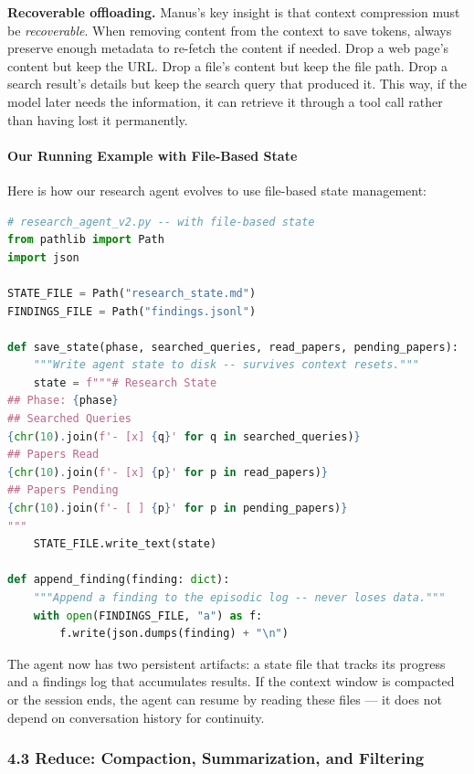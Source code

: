 \documentclass[11pt, a4paper]{article}
\begin{document}
\textbf{Recoverable offloading.} Manus's key insight is that context
compression must be \emph{recoverable}. When removing content from the
context to save tokens, always preserve enough metadata to re-fetch the
content if needed. Drop a web page's content but keep the URL. Drop a
file's content but keep the file path. Drop a search result's details
but keep the search query that produced it. This way, if the model later
needs the information, it can retrieve it through a tool call rather
than having lost it permanently.

\hypertarget{our-running-example-with-file-based-state}{%
\paragraph{Our Running Example with File-Based
State}\label{our-running-example-with-file-based-state}}

Here is how our research agent evolves to use file-based state
management:

\begin{lstlisting}[language=Python]
# research_agent_v2.py -- with file-based state
from pathlib import Path
import json

STATE_FILE = Path("research_state.md")
FINDINGS_FILE = Path("findings.jsonl")

def save_state(phase, searched_queries, read_papers, pending_papers):
    """Write agent state to disk -- survives context resets."""
    state = f"""# Research State
## Phase: {phase}
## Searched Queries
{chr(10).join(f'- [x] {q}' for q in searched_queries)}
## Papers Read
{chr(10).join(f'- [x] {p}' for p in read_papers)}
## Papers Pending
{chr(10).join(f'- [ ] {p}' for p in pending_papers)}
"""
    STATE_FILE.write_text(state)

def append_finding(finding: dict):
    """Append a finding to the episodic log -- never loses data."""
    with open(FINDINGS_FILE, "a") as f:
        f.write(json.dumps(finding) + "\n")
\end{lstlisting}

The agent now has two persistent artifacts: a state file that tracks its
progress and a findings log that accumulates results. If the context
window is compacted or the session ends, the agent can resume by reading
these files --- it does not depend on conversation history for
continuity.

\hypertarget{reduce-compaction-summarization-and-filtering}{%
\subsubsection{4.3 Reduce: Compaction, Summarization, and
Filtering}\label{reduce-compaction-summarization-and-filtering}}
\end{document}
